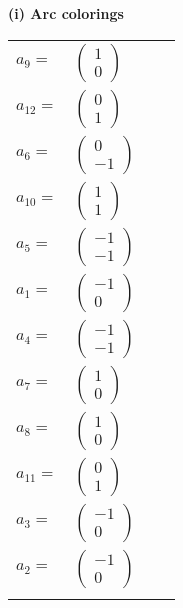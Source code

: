 \documentclass[1p]{elsarticle_modified}
\theoremstyle{definition}
\begin{document}
\flushleft \textbf{(i) Arc colorings}\\
\begin{tabular}{m{7pt} m{180pt} m{7pt} m{180pt} }
\flushright $a_{9}=$&$\begin{pmatrix}1\\0\end{pmatrix}$ \\
\flushright $a_{12}=$&$\begin{pmatrix}0\\1\end{pmatrix}$ \\
\flushright $a_{6}=$&$\begin{pmatrix}0\\-1\end{pmatrix}$ \\
\flushright $a_{10}=$&$\begin{pmatrix}1\\1\end{pmatrix}$ \\
\flushright $a_{5}=$&$\begin{pmatrix}-1\\-1\end{pmatrix}$ \\
\flushright $a_{1}=$&$\begin{pmatrix}-1\\0\end{pmatrix}$ \\
\flushright $a_{4}=$&$\begin{pmatrix}-1\\-1\end{pmatrix}$ \\
\flushright $a_{7}=$&$\begin{pmatrix}1\\0\end{pmatrix}$ \\
\flushright $a_{8}=$&$\begin{pmatrix}1\\0\end{pmatrix}$ \\
\flushright $a_{11}=$&$\begin{pmatrix}0\\1\end{pmatrix}$ \\
\flushright $a_{3}=$&$\begin{pmatrix}-1\\0\end{pmatrix}$ \\
\flushright $a_{2}=$&$\begin{pmatrix}-1\\0\end{pmatrix}$\\&\end{tabular}
\end{document}

